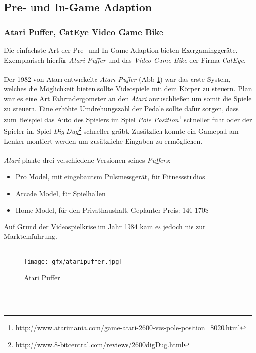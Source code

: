	\subsection*{Pre- und In-Game Adaption}
		\subsubsection{Atari Puffer, CatEye Video Game Bike}\label{ergometer}
			Die einfachste Art der Pre- und In-Game Adaption bieten Exergaminggeräte. Exemplarisch hierfür 						\textit{Atari Puffer} und das \textit{Video Game Bike} der Firma \textit{CatEye}.
			\\ \\
			Der 1982 von Atari entwickelte \textit{Atari Puffer} (Abb \ref{ataripuffer}) \cite{Sinclair:2007:CDE:1321261.1321313} war das erste System, welches die Möglichkeit bieten
			sollte Videospiele mit dem Körper zu steuern. Plan war es eine Art Fahrradergometer an den \textit{Atari} 					anzuschließen um somit die Spiele zu steuern. Eine erhöhte Umdrehungszahl der Pedale sollte dafür sorgen,
			dass zum Beispiel das Auto des Spielers im Spiel \textit{Pole Position}\footnote{\url{http://www.atarimania.com/game-atari-2600-vcs-pole-position_8020.html}} schneller fuhr oder der Spieler im Spiel
			\textit{Dig-Dug}\footnote{\url{http://www.8-bitcentral.com/reviews/2600digDug.html}} schneller gräbt. Zusätzlich konnte ein Gamepad am Lenker montiert werden um zusätzliche
			Eingaben zu ermöglichen.
			\\ \\
			\textit{Atari} plante drei verschiedene Versionen seines \textit{Puffers}:
			\begin{itemize}
				\item{Pro Model, mit eingebautem Pulsmessgerät, für Fitnessstudios}
				\item{Arcade Model, für Spielhallen}
				\item{Home Model, für den Privathaushalt. Geplanter Preis: 140-170\$}
			\end{itemize}
			Auf Grund der Videospielkrise im Jahr 1984 kam es jedoch nie zur Markteinführung.
			\\ \\
			\begin{figure}[h]
 				\centering
   	 			\texttt{[image: gfx/ataripuffer.jpg]} 
    				\caption{Atari Puffer}
   	 			\label{ataripuffer}
			\end{figure}
			\\ \\

